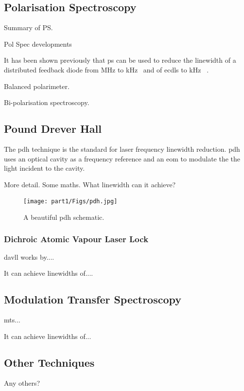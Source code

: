 \subsection{Polarisation Spectroscopy}

Summary of PS.

Pol Spec developments

It has been shown previously that \gls*{ps} can be used to reduce the linewidth of a distributed feedback diode from \unit[2]{MHz} to \unit[20]{kHz}~\cite{torii_laser-phase_2012} and of \glspl*{ecdl} to \unit[65]{kHz}
~\cite{yoshikawa_frequency_2003}.

Balanced polarimeter.\cite{pearman_polarization_2002,yoshikawa_frequency_2003}

Bi-polarisation spectroscopy.\cite{tiwari_laser_2006}


\subsection{Pound Drever Hall}

The \gls{pdh} technique is the standard for laser frequency linewidth reduction.\cite{drever_laser_1983}
\gls{pdh} uses an optical cavity as a frequency reference and an \gls{eom} to modulate the the light incident to the cavity.

More detail. Some maths. What linewidth can it achieve?\cite{ludlow_compact_2007}

\begin{figure}
\centering
\texttt{[image: part1/Figs/pdh.jpg]}
\caption{A beautiful \gls{pdh} schematic.}
\end{figure}
\subsubsection{Dichroic Atomic Vapour Laser Lock}
\Gls{davll} works by....

It can achieve linewidths of....

\subsection{Modulation Transfer Spectroscopy}
\Gls{mts}...

It can achieve linewidths of...\cite{negnevitsky_wideband_2013}

\subsection{Other Techniques}

Any others?


